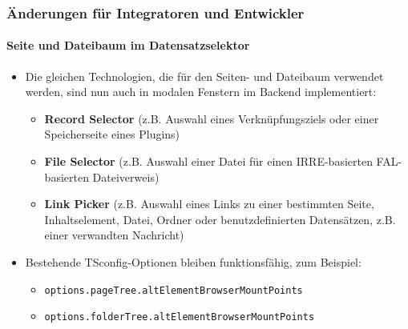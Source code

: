 %

\begin{frame}[fragile]
	\frametitle{Änderungen für Integratoren und Entwickler}
	\framesubtitle{Seite und Dateibaum im Datensatzselektor}


	\begin{itemize}
		\item Die gleichen Technologien, die für den Seiten- und Dateibaum verwendet werden, sind nun auch in
			modalen Fenstern im Backend implementiert:
			\begin{itemize}\normalsize
				\item \textbf{Record Selector}\newline
					\smaller(z.B. Auswahl eines Verknüpfungsziels oder einer Speicherseite eines Plugins)\normalsize
				\item \textbf{File Selector}\newline
				 	\smaller(z.B. Auswahl einer Datei für einen IRRE-basierten FAL-basierten Dateiverweis)\normalsize
				\item \textbf{Link Picker}\newline
					\smaller(z.B. Auswahl eines Links zu einer bestimmten Seite, Inhaltselement, Datei, Ordner oder benutzdefinierten Datensätzen, z.B. einer verwandten Nachricht)\normalsize
			\end{itemize}

		\item Bestehende TSconfig-Optionen bleiben funktionsfähig, zum Beispiel:

			\begin{itemize}\smaller
				\item \texttt{options.pageTree.altElementBrowserMountPoints}
				\item \texttt{options.folderTree.altElementBrowserMountPoints}
			\end{itemize}\smaller
	\end{itemize}

\end{frame}


